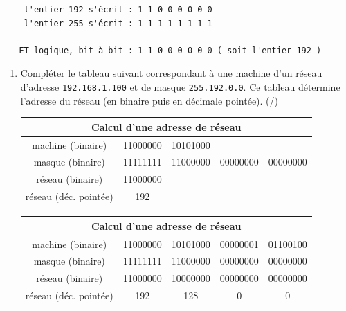 \begin{verbatim}   
    l'entier 192 s'écrit : 1 1 0 0 0 0 0 0
    l'entier 255 s'écrit : 1 1 1 1 1 1 1 1
---------------------------------------------------------
   ET logique, bit à bit : 1 1 0 0 0 0 0 0 ( soit l'entier 192 )
\end{verbatim}
\begin{enumerate}[resume=monDS]
    \item Compléter le tableau suivant correspondant à une machine d'un réseau d'adresse \texttt{192.168.1.100} et de masque \texttt{255.192.0.0}. Ce tableau détermine l'adresse du réseau (en binaire puis en décimale pointée). (/)

    \begin{blocvisiblex}[height=4.5]
    {
    
    \centering
    \renewcommand{\arraystretch}{1.5} %
    \begin{tabular}{|c|c|c|c|c|}
        \hline
        \multicolumn{5}{|c|}{\textbf{Calcul d'une adresse de réseau}} \\ \hline
        machine (binaire)        & 11000000 & 10101000 &          &          \\ \hline
        masque (binaire)         & 11111111 & 11000000 & 00000000 & 00000000 \\ \hline
        réseau (binaire)         & 11000000 &          &          &          \\ \hline
        réseau (déc. pointée)    & 192      &          &          &          \\ \hline
    \end{tabular}
}
\centering
    \renewcommand{\arraystretch}{1.5} %
    \begin{tabular}{|c|c|c|c|c|}
        \hline
        \multicolumn{5}{|c|}{\textbf{Calcul d'une adresse de réseau}} \\ \hline
        machine (binaire)        & 11000000 & 10101000 & 00000001 & 01100100\\ \hline
        masque (binaire)         & 11111111 & 11000000 & 00000000 & 00000000 \\ \hline
        réseau (binaire)         & 11000000 & 10000000 & 00000000 & 00000000 \\ \hline
        réseau (déc. pointée)    & 192      & 128      & 0        & 0        \\ \hline
    \end{tabular}
    \end{blocvisiblex}

\end{enumerate}

